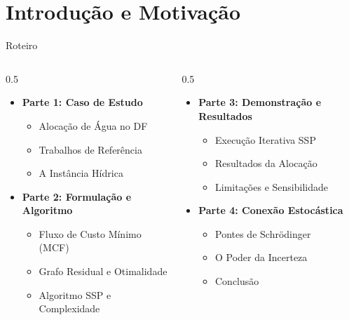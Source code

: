 \section{Introdução e Motivação}

\begin{frame}{Roteiro}
  \begin{columns}
    \begin{column}{0.5\textwidth}
      \begin{itemize}
        \item \textbf{Parte 1: Caso de Estudo}
        \begin{itemize}
          \item Alocação de Água no DF
          \item Trabalhos de Referência
          \item A Instância Hídrica
        \end{itemize}
        \vspace{0.3cm}
        \item \textbf{Parte 2: Formulação e Algoritmo}
        \begin{itemize}
          \item Fluxo de Custo Mínimo (MCF)
          \item Grafo Residual e Otimalidade
          \item Algoritmo SSP e Complexidade
        \end{itemize}
      \end{itemize}
    \end{column}
    \begin{column}{0.5\textwidth}
      \begin{itemize}
        \item \textbf{Parte 3: Demonstração e Resultados}
        \begin{itemize}
          \item Execução Iterativa SSP
          \item Resultados da Alocação
          \item Limitações e Sensibilidade
        \end{itemize}
        \vspace{0.3cm}
        \item \textbf{Parte 4: Conexão Estocástica}
        \begin{itemize}
          \item Pontes de Schrödinger
          \item O Poder da Incerteza
          \item Conclusão
        \end{itemize}
      \end{itemize}
    \end{column}
  \end{columns}
\end{frame}

